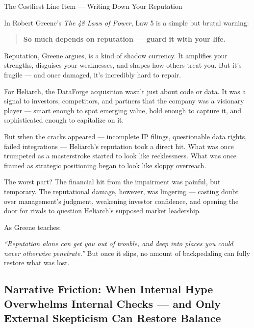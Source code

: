 \begin{HistoricalSidebar}{The Costliest Line Item --- Writing Down Your Reputation}

In Robert Greene’s \textit{The 48 Laws of Power}, Law 5 is a simple but brutal warning:

\begin{quote}
    \textbf{So much depends on reputation — guard it with your life.}
\end{quote}

Reputation, Greene argues, is a kind of shadow currency.  
It amplifies your strengths, disguises your weaknesses, and shapes how others treat you.  
But it’s fragile — and once damaged, it’s incredibly hard to repair.

\medskip

For Heliarch, the DataForge acquisition wasn’t just about code or data.  
It was a signal to investors, competitors, and partners that the company was a visionary player —  
smart enough to spot emerging value, bold enough to capture it, and sophisticated enough to capitalize on it.

\medskip

But when the cracks appeared — incomplete IP filings, questionable data rights, failed integrations —  
Heliarch’s reputation took a direct hit.  
What was once trumpeted as a masterstroke started to look like recklessness.  
What was once framed as strategic positioning began to look like sloppy overreach.

\medskip

The worst part?  
The financial hit from the impairment was painful, but temporary.  
The reputational damage, however, was lingering —  
casting doubt over management’s judgment, weakening investor confidence, and opening the door for rivals to question Heliarch’s supposed market leadership.

\medskip

As Greene teaches:  

\medskip

\textit{“Reputation alone can get you out of trouble, and deep into places you could never otherwise penetrate.”}  
But once it slips, no amount of backpedaling can fully restore what was lost.

\end{HistoricalSidebar}



\subsection{Narrative Friction: When Internal Hype Overwhelms Internal Checks — and Only External Skepticism Can Restore Balance}

